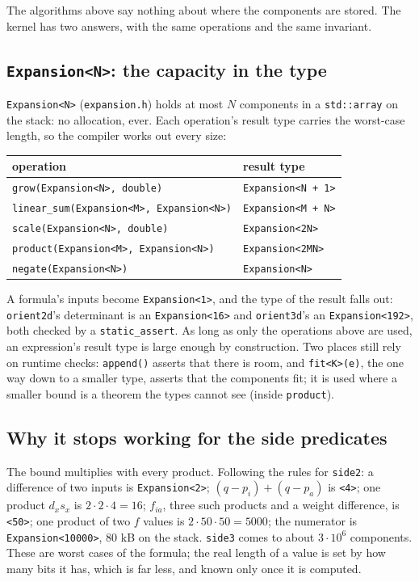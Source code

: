 \documentclass[11pt,a4paper]{article}
\newcommand{\code}[1]{\texttt{#1}}
\theoremstyle{definition}
\theoremstyle{remark}
\begin{document}
The algorithms above say nothing about where the components are stored. The kernel has two
answers, with the same operations and the same invariant.

\subsection{\texorpdfstring{\code{Expansion<N>}}{Expansion<N>}: the capacity in the type}

\code{Expansion<N>} (\code{expansion.h}) holds at most $N$ components in a \code{std::array} on
the stack: no allocation, ever. Each operation's result type carries the worst-case length, so the
compiler works out every size:
\begin{center}
\begin{tabular}{@{}ll@{}}
  \toprule
  operation & result type \\
  \midrule
  \code{grow(Expansion<N>, double)} & \code{Expansion<N + 1>} \\
  \code{linear\_sum(Expansion<M>, Expansion<N>)} & \code{Expansion<M + N>} \\
  \code{scale(Expansion<N>, double)} & \code{Expansion<2N>} \\
  \code{product(Expansion<M>, Expansion<N>)} & \code{Expansion<2MN>} \\
  \code{negate(Expansion<N>)} & \code{Expansion<N>} \\
  \bottomrule
\end{tabular}
\end{center}
A formula's inputs become \code{Expansion<1>}, and the type of the result falls out: \code{orient2d}'s
determinant is an \code{Expansion<16>} and \code{orient3d}'s an \code{Expansion<192>}, both checked by
a \code{static\_assert}. As long as only the operations above are used, an expression's result
type is large enough by construction. Two places still rely on runtime checks: \code{append()}
asserts that there is room, and \code{fit<K>(e)}, the one way down to a smaller type, asserts that
the components fit; it is used where a smaller bound is a theorem the types cannot see (inside
\code{product}).

\subsection{Why it stops working for the side predicates}

The bound multiplies with every product. Following the rules for \code{side2}: a difference of two
inputs is \code{Expansion<2>}; $(q - p_i) + (q - p_a)$ is \code{<4>}; one product $d_x s_x$ is
$2\cdot2\cdot4 = 16$; $f_{ia}$, three such products and a weight difference, is \code{<50>}; one
product of two $f$ values is $2\cdot50\cdot50 = 5000$; the numerator is \code{Expansion<10000>},
80 kB on the stack. \code{side3} comes to about $3\cdot10^{6}$ components. These are worst cases of
the formula; the real length of a value is set by how many bits it has, which is far less, and known
only once it is computed.
\end{document}

